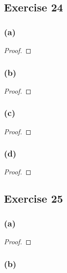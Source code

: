 \documentclass[14pt]{extarticle}
\begin{document}
\subsection{Exercise 24}

\subsubsection{(a)}

\begin{proof}

\end{proof}

\subsubsection{(b)}

\begin{proof}

\end{proof}

\subsubsection{(c)}

\begin{proof}

\end{proof}

\subsubsection{(d)}

\begin{proof}

\end{proof}

\subsection{Exercise 25}

\subsubsection{(a)}

\begin{proof}

\end{proof}

\subsubsection{(b)}
\end{document}
